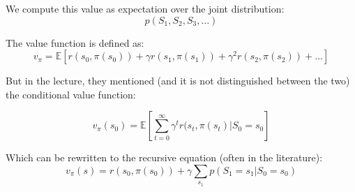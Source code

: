 \documentclass[main]{subfiles}
\begin{document}
We compute this value as expectation over the joint distribution:
\begin{equation}
p(S_{1}, S_{2}, S_{3}, \dots)
\end{equation}

The value function is defined as: 
\begin{equation}
    v_{\pi} = \mathbb{E}[r(s_0, \pi(s_0)) + \gamma r(s_1, \pi(s_1)) + \gamma^2 r(s_2, \pi(s_2)) + \dots]
\end{equation}

But in the  lecture, they mentioned (and it is not distinguished between the two) the conditional value function:

\begin{equation}
    v_{\pi}(s_0) = \mathbb{E}[\sum_{t=0}^\infty \gamma^t r(s_t, \pi(s_t) | S_0 = s_0]
\end{equation}

Which can be rewritten to the recursive equation (often in the literature):
\begin{equation}
v_{\pi}(s) = r(s_0, \pi(s_0)) + \gamma \sum_{s_1} p(S_1 =s_1 | S_0 = s_0)
\end{equation}
\end{document}

